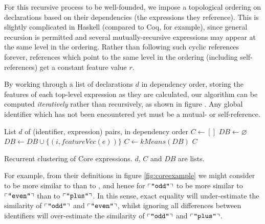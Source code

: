 For this recursive process to be well-founded, we impose a topological ordering on declarations based on their dependencies (the expressions they reference). This is slightly complicated in Haskell (compared to Coq, for example), since general recursion is permitted and several mutually-recursive expressions may appear at the same level in the ordering. Rather than following such cyclic references forever, references which point to the same level in the ordering (including self-references) get a constant feature value $r$.

By working through a list of declarations $d$ in dependency order, storing the features of each top-level expression as they are calculated, our algorithm can be computed \emph{iteratively} rather than recursively, as shown in figure . Any global identifier which has not been encountered yet must be a mutual- or self-reference.


\begin{algorithm}
  \begin{algorithmic}[1]
    \Require List $d$ of (identifier, expression) pairs, in dependency order
      \State $C  \gets []$
      \State $DB \gets \varnothing$
        \State $DB \gets DB \cup \{(i, featureVec(e))\}$
        \State $C  \gets kMeans(DB)$
      \EndFor
      \Return $C$
    \EndProcedure
  \end{algorithmic}
  \caption{Recurrent clustering of Core expressions. $d$, $C$ and $DB$ are lists.}\label{alg:recurrent}
\end{algorithm}

For example, from their definitions in figure \ref{fig:coreexample} we might consider  to be more similar to  than to , and hence for $\left\ulcorner \texttt{"odd"} \right\urcorner$ to be more similar to $\left\ulcorner \texttt{"even"} \right\urcorner$ than to $\left\ulcorner \texttt{"plus"} \right\urcorner$. In this sense, exact equality will under-estimate the similarity of $\left\ulcorner \texttt{"odd"} \right\urcorner$ and $\left\ulcorner \texttt{"even"} \right\urcorner$, whilst ignoring all differences between identifiers will over-estimate the similarity of $\left\ulcorner \texttt{"odd"} \right\urcorner$ and $\left\ulcorner \texttt{"plus"} \right\urcorner$.


\iffalse TODO: the code should go in the implementation section rather than here \fi
\iffalse TODO: maybe focus on the ``interesting cases'', and defer the nitty-gritty of extending the environment, etc. to the implementation section? \fi
\iffalse TODO: Split into three parts: expressions to rose trees of features; rose trees to matrices to vectors; k-means clustering \fi
\iffalse TODO: highlight the recurrent nature of the algorithm \fi
\iffalse TODO: I would probably just restructure:
 - then k-means
obviously, they are mutually recursive...
\fi

